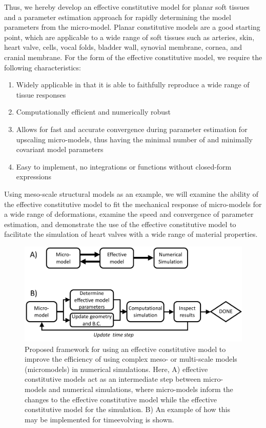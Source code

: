     
    Thus, we hereby develop an effective constitutive model for planar soft tissues and a parameter estimation approach for rapidly determining the model parameters from the micro-model. Planar constitutive models are a good starting point, which are applicable to a wide range of soft tissues such as arteries, skin, heart valve, cells, vocal folds, bladder wall, synovial membrane, cornea, and cranial membrane. For the form of the effective constitutive model, we require the following characteristics:
\begin{enumerate}
    \item Widely applicable in that it is able to faithfully reproduce a wide range of tissue responses
    \item Computationally efficient and numerically robust
    \item Allows for fast and accurate convergence during parameter estimation for upscaling micro-models, thus having the minimal number of and minimally covariant model parameters
    \item Easy to implement, no integrations or functions without closed-form expressions
\end{enumerate}
    Using meso-scale structural models as an example, we will examine the ability of the effective constitutive model to fit the mechanical response of micro-models for a wide range of deformations, examine the speed and convergence of parameter estimation, and demonstrate the use of the effective constitutive model to facilitate the simulation of heart valves with a wide range of material properties.
    
\begin{figure}
\centering
\includegraphics[width=\textwidth]{Images/chapter5/simulationframework}
\caption{Proposed framework for using an effective constitutive model to improve the efficiency of using complex meso- or multi-scale models (micro\Hyphdash models) in numerical simulations. Here, A) effective constitutive models act as an intermediate step between micro-models and numerical simulations, where micro-models inform the changes to the effective constitutive model while the effective constitutive model for the simulation. B) An example of how this may be implemented for time\Hyphdash evolving is shown.}
\label{fig:simulationframework}
\end{figure}
    
    
    
    
    
    
    
    
